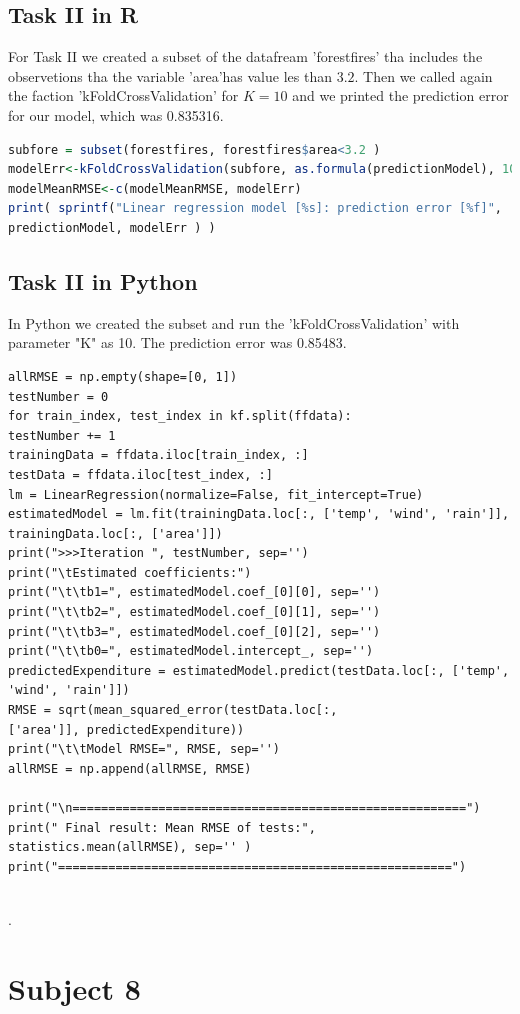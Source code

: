 \documentclass[10pt,a4paper]{article}
\begin{document}
	\subsection{Task II in R}
For Task II we created a subset of the datafream 'forestfires' tha includes the observetions tha the variable 'area'has value les than $3.2$. Then we called again the faction 'kFoldCrossValidation'  for $K = 10$ and we printed the prediction error for our model, which was 0.835316.
	\begin{lstlisting}[language=R]
subfore = subset(forestfires, forestfires$area<3.2 )
modelErr<-kFoldCrossValidation(subfore, as.formula(predictionModel), 10)
modelMeanRMSE<-c(modelMeanRMSE, modelErr)
print( sprintf("Linear regression model [%s]: prediction error [%f]",
predictionModel, modelErr ) ) 
	\end{lstlisting} \newpage
	\subsection{Task II in Python}
In Python we created the subset and run the 'kFoldCrossValidation' with parameter "K" as 10. The prediction error was 0.85483.
	\begin{lstlisting}
allRMSE = np.empty(shape=[0, 1])
testNumber = 0
for train_index, test_index in kf.split(ffdata):
testNumber += 1
trainingData = ffdata.iloc[train_index, :]
testData = ffdata.iloc[test_index, :]
lm = LinearRegression(normalize=False, fit_intercept=True)
estimatedModel = lm.fit(trainingData.loc[:, ['temp', 'wind', 'rain']], trainingData.loc[:, ['area']])
print(">>>Iteration ", testNumber, sep='')
print("\tEstimated coefficients:")
print("\t\tb1=", estimatedModel.coef_[0][0], sep='')
print("\t\tb2=", estimatedModel.coef_[0][1], sep='')
print("\t\tb3=", estimatedModel.coef_[0][2], sep='')
print("\t\tb0=", estimatedModel.intercept_, sep='')
predictedExpenditure = estimatedModel.predict(testData.loc[:, ['temp', 'wind', 'rain']])
RMSE = sqrt(mean_squared_error(testData.loc[:, 
['area']], predictedExpenditure))
print("\t\tModel RMSE=", RMSE, sep='')
allRMSE = np.append(allRMSE, RMSE)
	
print("\n=======================================================")
print(" Final result: Mean RMSE of tests:", 
statistics.mean(allRMSE), sep='' )
print("=======================================================")
		
	\end{lstlisting}.
\section {Subject 8}
\end{document}
